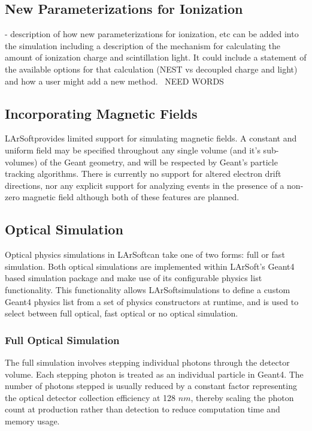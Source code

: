 \documentclass[12pt]{elsarticle}
\newcommand{\larsoft}{LArSoft}
\begin{document}
\subsection{New Parameterizations for Ionization}
\label{sec:ionization}
- description of how new parameterizations for ionization, etc can be added into the simulation including a description of the mechanism for calculating the amount of ionization charge and scintillation light.  It could include a statement of the available options for that calculation (NEST vs decoupled charge and light) and how a user might add a new method.~\cite{nest}
NEED WORDS

\subsection{Incorporating Magnetic Fields}
\larsoft provides limited support for simulating magnetic
fields. A constant and uniform field may be specified
throughout any single volume (and it's sub-volumes) of the Geant
geometry, and will be respected by Geant's particle tracking
algorithms. There is currently no support for altered electron
drift directions, nor any explicit support for analyzing events
in the presence of a non-zero magnetic field although both of these features are planned.

\subsection{Optical Simulation}
Optical physics simulations in \larsoft can take one of two forms: full or fast simulation.  Both optical simulations are implemented within \larsoft's Geant4 based simulation package and make use of its configurable physics list functionality.  This functionality allows \larsoft simulations to define a custom Geant4 physics list from a set of physics constructors at runtime, and is used to select between full optical, fast optical or no optical simulation. 

\subsubsection{Full Optical Simulation}
The full simulation involves stepping individual photons through the detector volume.  Each stepping photon is treated as an individual particle in Geant4.  The number of photons stepped is usually reduced by a constant factor representing the optical detector collection efficiency at 128 $nm$, thereby scaling the photon count at production rather than detection to reduce computation time and memory usage. 
\end{document}
